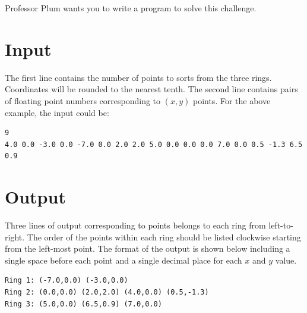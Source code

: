 \documentclass{article}
\begin{document}
Professor Plum wants you to write a program to solve this challenge.

\section*{Input}
The first line contains the number of points to sorts from the three rings.  Coordinates will be rounded to the nearest tenth.  The second line contains pairs of floating point numbers corresponding to $(x, y)$ points.  For the above example, the input could be:
\begin{verbatim}
9
4.0 0.0 -3.0 0.0 -7.0 0.0 2.0 2.0 5.0 0.0 0.0 0.0 7.0 0.0 0.5 -1.3 6.5 0.9
\end{verbatim}

\section*{Output}
Three lines of output corresponding to points belongs to each ring from left-to-right.  The order of the points within each ring should be listed clockwise starting from the left-most point.  The format of the output is shown below including a single space before each point and a single decimal place for each $x$ and $y$ value.

\begin{verbatim}
Ring 1: (-7.0,0.0) (-3.0,0.0)
Ring 2: (0.0,0.0) (2.0,2.0) (4.0,0.0) (0.5,-1.3)
Ring 3: (5.0,0.0) (6.5,0.9) (7.0,0.0)
\end{verbatim}
\end{document}
